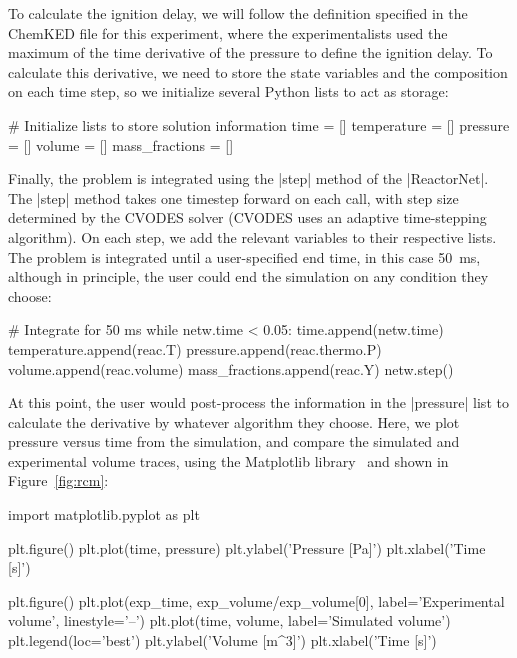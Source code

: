 \documentclass[12pt]{ijck}
\newcommand\ck{ChemKED}
\begin{document}
To calculate the ignition delay, we will follow the definition specified in the \ck{} file for
this experiment, where the experimentalists used the maximum of the time derivative of the pressure
to define the ignition delay. To calculate this derivative, we need to store the state variables
and the composition on each time step, so we initialize several Python lists to act as storage:
%
\begin{pythonbox}
# Initialize lists to store solution information
time = []
temperature = []
pressure = []
volume = []
mass_fractions = []
\end{pythonbox}

Finally, the problem is integrated using the \pybox|step| method of the \pybox|ReactorNet|. The
\pybox|step| method takes one timestep forward on each call, with step size determined by the CVODES
solver (CVODES uses an adaptive time-stepping algorithm). On each step, we add the relevant
variables to their respective lists. The problem is integrated until a user-specified end time, in
this case \SI{50}{\milli\second}, although in principle, the user could end the simulation on any
condition they choose:
%
\begin{pythonbox}
# Integrate for 50 ms
while netw.time < 0.05:
    time.append(netw.time)
    temperature.append(reac.T)
    pressure.append(reac.thermo.P)
    volume.append(reac.volume)
    mass_fractions.append(reac.Y)
    netw.step()
\end{pythonbox}

At this point, the user would post-process the information in the \pybox|pressure| list to calculate
the derivative by whatever algorithm they choose. Here, we plot pressure versus time from the
simulation, and compare the simulated and experimental volume traces,
using the Matplotlib library~\cite{matplotlib} and shown in Figure~\ref{fig:rcm}:
%
\begin{pythonbox}
import matplotlib.pyplot as plt

plt.figure()
plt.plot(time, pressure)
plt.ylabel('Pressure [Pa]')
plt.xlabel('Time [s]')

plt.figure()
plt.plot(exp_time, exp_volume/exp_volume[0], label='Experimental volume', linestyle='--')
plt.plot(time, volume, label='Simulated volume')
plt.legend(loc='best')
plt.ylabel('Volume [m^3]')
plt.xlabel('Time [s]')
\end{pythonbox}
\end{document}
